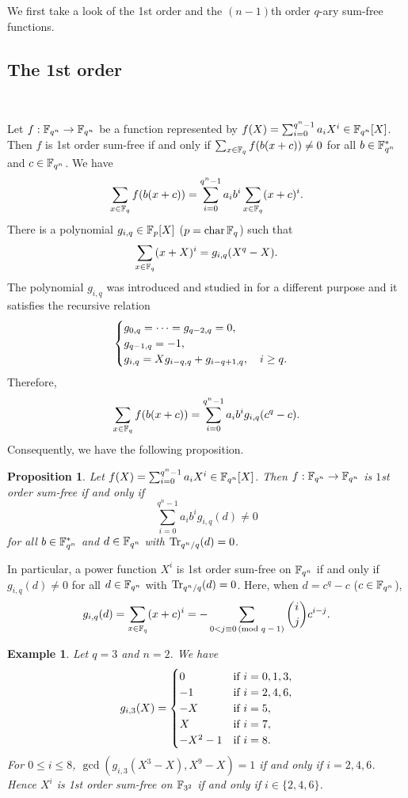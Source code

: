 \documentclass{amsart}
\newtheorem{prop}[thm]{Proposition}
\newtheorem{exmp}[thm]{Example}
\numberwithin{equation}{section}
\theoremstyle{definition}
\newcommand{\f}{\Bbb F}
\newcommand{\tr}{\text{\rm Tr}}
\begin{document}
We first take a look of the 1st order and the $(n-1)$th order $q$-ary sum-free functions.


\subsection{The 1st order}\

Let $f:\f_{q^n}\to\f_{q^n}$ be a function represented by $f(X)=\sum_{i=0}^{q^n-1}a_iX^i\in\f_{q^n}[X]$. Then $f$ is 1st order sum-free if and only if $\sum_{x\in\f_q}f(b(x+c))\ne 0$ for all $b\in\f_{q^n}^*$ and $c\in\f_{q^n}$. We have
\[
\sum_{x\in\f_q}f(b(x+c))=\sum_{i=0}^{q^n-1}a_ib^i\sum_{x\in\f_q}(x+c)^i.
\]
There is a polynomial $g_{i,q}\in\f_p[X]$ ($p=\text{char}\,\f_q$) such that 
\begin{equation}\label{giq}
\sum_{x\in\f_q}(x+X)^i=g_{i,q}(X^q-X).
\end{equation}
The polynomial $g_{i,q}$ was introduced and studied in \cite{Hou-FFA-2012} for a different purpose and it satisfies the recursive relation
\[
\begin{cases}
g_{0,q}=\cdots=g_{q-2,q}=0,\cr
g_{q-1,q}=-1,\cr
g_{i,q}=Xg_{i-q,q}+g_{i-q+1,q},\quad i\ge q.
\end{cases}
\]
Therefore,
\[
\sum_{x\in\f_q}f(b(x+c))=\sum_{i=0}^{q^n-1}a_ib^ig_{i,q}(c^q-c).
\]
Consequently, we have the following proposition.

\begin{prop}\label{P4.1}
Let $f(X)=\sum_{i=0}^{q^n-1}a_iX^i\in\f_{q^n}[X]$. Then $f:\f_{q^n}\to\f_{q^n}$ is $1$st order sum-free if and only if 
\[
\sum_{i=0}^{q^n-1}a_ib^ig_{i,q}(d)\ne 0
\]
for all $b\in\f_{q^n}^*$ and $d\in\f_{q^n}$ with $\tr_{q^n/q}(d)=0$.
\end{prop}

In particular, a power function $X^i$ is 1st order sum-free on $\f_{q^n}$ if and only if 
$g_{i,q}(d)\ne 0$ for all $d\in\f_{q^n}$ with $\tr_{q^n/q}(d)=0$. Here, when $d=c^q-c$ ($c\in\f_{q^n}$), 
\[
g_{i,q}(d)=\sum_{x\in\f_q}(x+c)^i=-\sum_{0<j\equiv 0\, \text{(mod $q-1$)}}\binom ij c^{i-j}.
\]

\begin{exmp}\label{E4.2}\rm
Let $q=3$ and $n=2$. We have
\[
g_{i,3}(X)=\begin{cases}
0&\text{if}\ i=0,1,3,\cr
-1&\text{if}\ i=2,4,6,\cr
-X&\text{if}\ i=5,\cr
X&\text{if}\ i=7,\cr
-X^2-1&\text{if}\ i=8.
\end{cases}
\]
For $0\le i\le 8$, $\gcd(g_{i,3}(X^3-X),X^9-X)=1$ if and only if $i=2,4,6$. Hence $X^i$ is 1st order sum-free on $\f_{3^2}$ if and only if $i\in\{2,4,6\}$.
\end{exmp}
\end{document}

